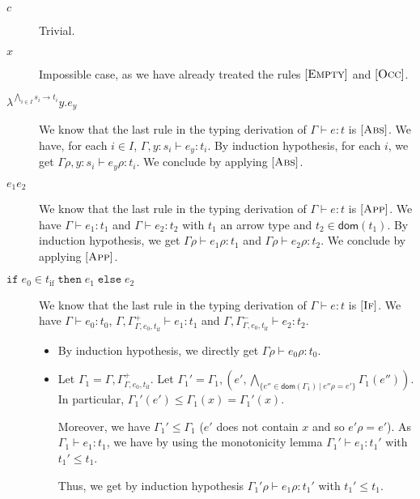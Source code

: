 \documentclass[a4paper]{article}%
\newcommand{\dom}[1]{\textsf{dom}(#1)}
\newcommand{\alt}{~|~}
\newcommand{\ite}[4]{\ensuremath{\texttt{if}\;#1\in#2\;\texttt{then}\;#3\;\texttt{else}\;#4}}
\theoremstyle{definition}
\newcommand {\Rule}[1] {[\textsc{#1}]}
\begin{document}
    \begin{description}
      \item[$c$] Trivial.
      \item[$x$] Impossible case, as we have already treated the rules $\Rule{Empty}$ and $\Rule{Occ}$.
      \item[$\lambda^{\bigwedge_{i\in I} s_i \rightarrow t_i}y.e_y$]
      We know that the last rule in the typing derivation of $\Gamma \vdash e:t$ is $\Rule {Abs}$.
      We have, for each $i \in I$, $\Gamma,y:s_i \vdash e_y:t_i$.
      By induction hypothesis, for each $i$, we get  $\Gamma\rho,y:s_i \vdash e_y\rho:t_i$. We conclude by applying $\Rule {Abs}$.
      \item[$e_1 e_2$] We know that the last rule in the typing derivation of $\Gamma \vdash e:t$ is $\Rule {App}$.
      We have $\Gamma\vdash e_1:t_1$ and $\Gamma\vdash e_2:t_2$ with $t_1$ an arrow type and $t_2 \in \dom {t_1}$.
      By induction hypothesis, we get $\Gamma\rho\vdash e_1\rho:t_1$ and $\Gamma\rho\vdash e_2\rho:t_2$. We conclude by applying $\Rule {App}$.
      \item[$\ite {e_0} {t_{\text{if}}} {e_1}{e_2}$] We know that the last rule in the typing derivation of $\Gamma \vdash e:t$ is $\Rule {If}$.
      We have $\Gamma\vdash e_0:t_0$, $\Gamma,\Gamma^+_{\Gamma,e_0,t_{\text{if}}}\vdash e_1 : t_1$ and $\Gamma,\Gamma^-_{\Gamma,e_0,t_{\text{if}}}\vdash e_2 : t_2$.
      \begin{itemize}
        \item By induction hypothesis, we directly get $\Gamma\rho\vdash e_0\rho:t_0$.
        \item Let $\Gamma_1 = \Gamma,\Gamma^+_{\Gamma,e_0,t_{\text{if}}}$. Let $\Gamma_1'=\Gamma_1,(e',\bigwedge_{\{e''\in \dom {\Gamma_1}\alt e''\rho=e'\}} \Gamma_1(e''))$.
        In particular, $\Gamma_1'(e')\leq\Gamma_1(x)=\Gamma_1'(x)$.
        
        Moreover, we have $\Gamma_1' \leq \Gamma_1$ ($e'$ does not contain $x$ and so $e'\rho=e'$).
        As $\Gamma_1 \vdash e_1:t_1$, we have by using the monotonicity lemma $\Gamma_1' \vdash e_1:t_1'$ with $t_1'\leq t_1$.

        Thus, we get by induction hypothesis $\Gamma_1'\rho\vdash e_1\rho:t_1'$ with $t_1' \leq t_1$.


\end{itemize}
\end{description}
\end{document}
